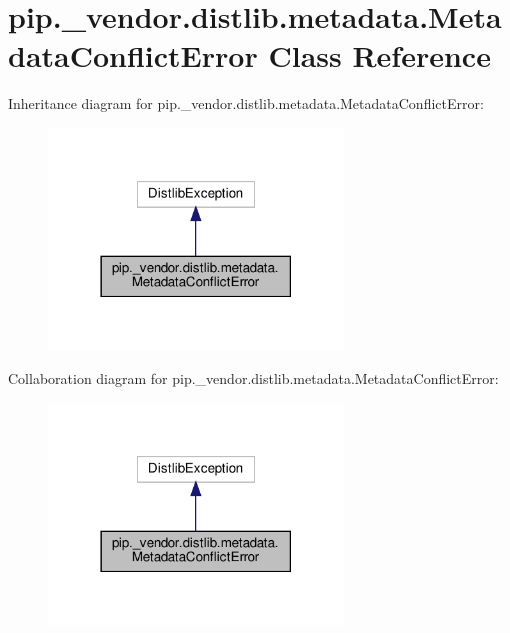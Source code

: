 \hypertarget{classpip_1_1__vendor_1_1distlib_1_1metadata_1_1MetadataConflictError}{}\section{pip.\+\_\+vendor.\+distlib.\+metadata.\+Metadata\+Conflict\+Error Class Reference}
\label{classpip_1_1__vendor_1_1distlib_1_1metadata_1_1MetadataConflictError}


Inheritance diagram for pip.\+\_\+vendor.\+distlib.\+metadata.\+Metadata\+Conflict\+Error\+:
\nopagebreak
\begin{figure}[H]
\begin{center}
\leavevmode
\includegraphics[width=222pt]{classpip_1_1__vendor_1_1distlib_1_1metadata_1_1MetadataConflictError__inherit__graph}
\end{center}
\end{figure}


Collaboration diagram for pip.\+\_\+vendor.\+distlib.\+metadata.\+Metadata\+Conflict\+Error\+:
\nopagebreak
\begin{figure}[H]
\begin{center}
\leavevmode
\includegraphics[width=222pt]{classpip_1_1__vendor_1_1distlib_1_1metadata_1_1MetadataConflictError__coll__graph}
\end{center}
\end{figure}


